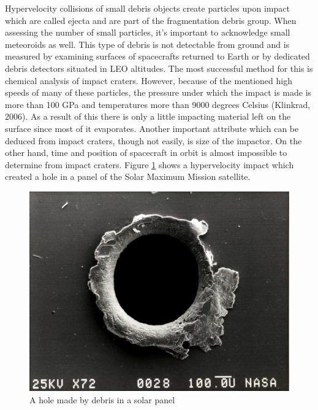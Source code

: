 	Hypervelocity collisions of small debris objects create particles upon impact which are called ejecta and are part of the fragmentation debris group. When assessing the number of small particles, it’s important to acknowledge small meteoroids as well. This type of debris is not detectable from ground and is measured by examining surfaces of spacecrafts returned to Earth or by dedicated debris detectors situated in LEO altitudes. The most successful method for this is chemical analysis of impact craters. However, because of the mentioned high speeds of many of these particles, the pressure under which the impact is made is more than 100 GPa and temperatures more than 9000 degrees Celsius (Klinkrad, 2006). As a result of this there is only a little impacting material left on the surface since most of it evaporates. Another important attribute which can be deduced from impact craters, though not easily, is size of the impactor.  On the other hand, time and position of spacecraft in orbit is almost impossible to determine from impact craters. Figure \ref{fig:hypervelocitycollision} shows a hypervelocity impact which created a hole in a panel of the Solar Maximum Mission satellite.
	
\begin{figure}[H]
  \includegraphics[width=\linewidth]{images/hypervelocitycollision}
  \caption{A hole made by debris in a solar panel}
  \label{fig:hypervelocitycollision}
\end{figure}	
	
